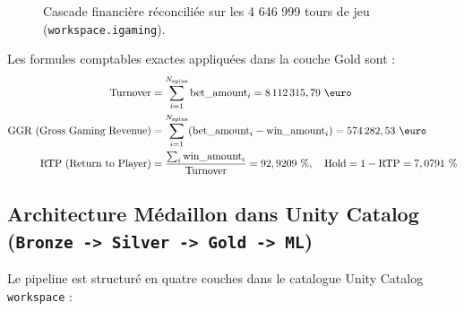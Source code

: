 \documentclass[11pt,a4paper]{article}
\begin{document}
\begin{figure}[h!]
{%
}
\caption{Cascade financière réconciliée sur les 4 646 999 tours de jeu (\texttt{workspace.igaming}).}
\end{figure}

Les formules comptables exactes appliquées dans la couche Gold sont :
\begin{align}
    \text{Turnover} &= \sum_{i=1}^{N_{\text{spins}}} \text{bet\_amount}_i = 8\,112\,315,79\text{ \euro} \\
    \text{GGR (Gross Gaming Revenue)} &= \sum_{i=1}^{N_{\text{spins}}} (\text{bet\_amount}_i - \text{win\_amount}_i) = 574\,282,53\text{ \euro} \\
    \text{RTP (Return to Player)} &= \frac{\sum_{i} \text{win\_amount}_i}{\text{Turnover}} = 92,9209\text{ \%}, \quad \text{Hold} = 1 - \text{RTP} = 7,0791\text{ \%}
\end{align}

\subsection{Architecture Médaillon dans Unity Catalog (\texttt{Bronze -> Silver -> Gold -> ML})}
Le pipeline est structuré en quatre couches dans le catalogue Unity Catalog \texttt{workspace} :
\end{document}

